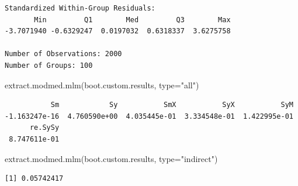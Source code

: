 \documentclass[
  letterpaper,
  DIV=11,
  numbers=noendperiod]{scrreprt}
\newenvironment{Shaded}{\begin{snugshade}}{\end{snugshade}}
\newcommand{\AttributeTok}[1]{\textcolor[rgb]{0.40,0.45,0.13}{#1}}
\newcommand{\CommentTok}[1]{\textcolor[rgb]{0.37,0.37,0.37}{#1}}
\newcommand{\ConstantTok}[1]{\textcolor[rgb]{0.56,0.35,0.01}{#1}}
\newcommand{\FloatTok}[1]{\textcolor[rgb]{0.68,0.00,0.00}{#1}}
\newcommand{\FunctionTok}[1]{\textcolor[rgb]{0.28,0.35,0.67}{#1}}
\newcommand{\NormalTok}[1]{\textcolor[rgb]{0.00,0.23,0.31}{#1}}
\newcommand{\OtherTok}[1]{\textcolor[rgb]{0.00,0.23,0.31}{#1}}
\newcommand{\SpecialCharTok}[1]{\textcolor[rgb]{0.37,0.37,0.37}{#1}}
\newcommand{\StringTok}[1]{\textcolor[rgb]{0.13,0.47,0.30}{#1}}
\begin{document}
\begin{tcolorbox}
\begin{verbatim}
Standardized Within-Group Residuals:
       Min         Q1        Med         Q3        Max 
-3.7071940 -0.6329247  0.0197032  0.6318337  3.6275758 

Number of Observations: 2000
Number of Groups: 100 
\end{verbatim}

\begin{Shaded}
\begin{Highlighting}[]
\FunctionTok{extract.modmed.mlm}\NormalTok{(boot.custom.results, }\AttributeTok{type=}\StringTok{"all"}\NormalTok{)}
\end{Highlighting}
\end{Shaded}

\begin{verbatim}
           Sm            Sy           SmX           SyX           SyM 
-1.163247e-16  4.760590e+00  4.035445e-01  3.334548e-01  1.422995e-01 
      re.SySy 
 8.747611e-01 
\end{verbatim}

\begin{Shaded}
\begin{Highlighting}[]
\FunctionTok{extract.modmed.mlm}\NormalTok{(boot.custom.results, }\AttributeTok{type=}\StringTok{"indirect"}\NormalTok{)}
\end{Highlighting}
\end{Shaded}

\begin{verbatim}
[1] 0.05742417
\end{verbatim}

\begin{Shaded}
\end{Shaded}


\end{tcolorbox}
\end{document}
